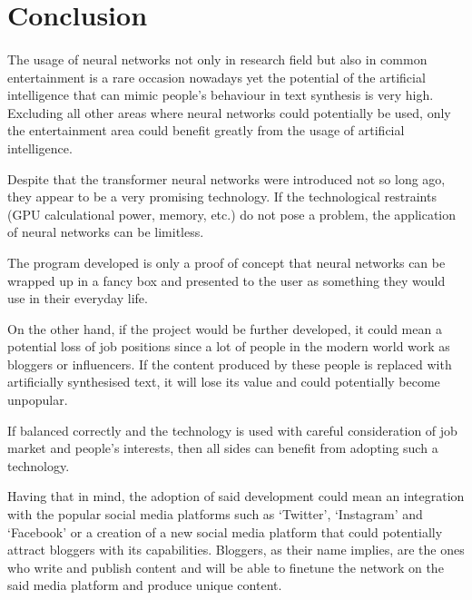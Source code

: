 \documentclass[12pt]{report}
\begin{document}
\section*{Conclusion}
\paragraph{}
The usage of neural networks not only in research field but also in common entertainment is a rare occasion nowadays yet the potential of 
the artificial intelligence that can mimic people's behaviour in text synthesis is very high. Excluding all other areas where neural networks
could potentially be used, only the entertainment area could benefit greatly from the usage of artificial intelligence. 

Despite that the transformer neural networks were introduced not so long ago, they appear to be a very promising technology. If the
technological restraints (GPU calculational power, memory, etc.) do not pose a problem, the application of neural networks can be
limitless.

The program developed is only a proof of concept that neural networks can be wrapped up in a fancy box and presented to the user as something
they would use in their everyday life.

On the other hand, if the project would be further developed, it could mean a potential loss of job positions since a lot of people in the modern
world work as bloggers or influencers. If the content produced by these people is replaced with artificially synthesised text, it will lose its
value and could potentially become unpopular.

If balanced correctly and the technology is used with careful consideration of job market and people's interests, then
all sides can benefit from adopting such a technology.

Having that in mind, the adoption of said development could mean an integration with the popular social media platforms such as `Twitter',
`Instagram' and `Facebook' or a creation of a new social media platform that could potentially attract bloggers with its capabilities.
Bloggers, as their name implies, are the ones who write and publish content and will be able to finetune the network on the said media platform and produce
unique content.






{}

\end{document}
